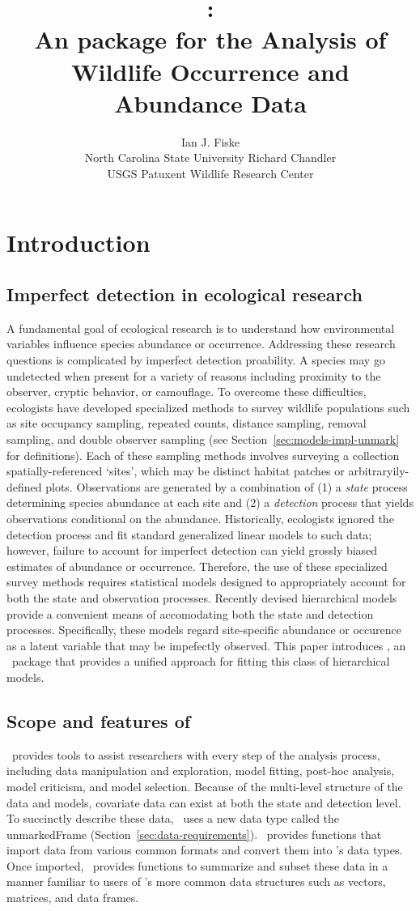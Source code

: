 \documentclass[article,shortnames]{jss}
\author{Ian J. Fiske\\North Carolina State University \And
  Richard Chandler\\ USGS Patuxent Wildlife Research Center}
\title{\pkg{unmarked}:\\
  An \proglang{R} package for the Analysis of Wildlife Occurrence and Abundance Data}
\newcommand{\um}{\pkg{unmarked}}
\newcommand{\rlang}{\proglang{R}}
\begin{document}
\section{Introduction}


\subsection{Imperfect detection in ecological research}

A fundamental goal of ecological research is to understand how environmental variables influence species abundance or occurrence.  Addressing these research questions is complicated by imperfect detection proability.  A species may go undetected when present for a variety of reasons including proximity to the observer, cryptic behavior, or camouflage.  To overcome these difficulties, ecologists have developed specialized methods to survey wildlife populations such as site occupancy sampling, repeated counts, distance sampling, removal sampling, and double observer sampling (see Section~\ref{sec:models-impl-unmark} for definitions).  Each of these sampling methods involves surveying a collection spatially-referenced `sites', which may be distinct habitat patches or arbitraryily-defined plots.  Observations are generated by a combination of (1) a \emph{state} process determining species abundance at each site and (2) a \emph{detection} process that yields observations conditional on the abundance.  Historically, ecologists ignored the detection process and fit standard generalized linear models to such data; however, failure to account for imperfect detection can yield grossly biased estimates of abundance or occurrence.  Therefore, the use of these specialized survey methods requires statistical models designed to appropriately account for both the state and observation processes. Recently devised hierarchical models provide a convenient means of accomodating both the state and detection processes.  Specifically,  these models regard site-specific abundance or occurence as a latent variable that may be impefectly observed.  This paper introduces \um, an \rlang\ package that provides a unified approach for fitting this class of hierarchical models.

\subsection[Scope and features of unmarked]{Scope and features of } 

\um\ provides tools to assist researchers with every step of the analysis process, including data manipulation and exploration, model fitting, post-hoc analysis, model criticism, and model selection.  Because of the multi-level structure of the data and models, covariate data can exist at both the state and detection level.  To succinctly describe these data, \um\ uses a new data type called the unmarkedFrame (Section~\ref{sec:data-requirements}).  \um\ provides functions that import data from various common formats and convert them into \um's data types.  Once imported, \um\ provides functions to summarize and subset these data in a manner familiar to users of \rlang's more common data structures such as vectors, matrices, and data frames. 
\end{document}
